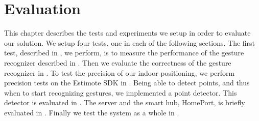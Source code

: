 \chapter{Evaluation}\label{chap:evaluation}
This chapter describes the tests and experiments we setup in order to evaluate our solution. 
We setup four tests, one in each of the following sections. 
The first test, described in , we perform, 
is to measure the performance of the gesture recognizer described in . 
Then we evaluate the correctness of the gesture recognizer in .
To test the precision of our indoor positioning, 
we perform precision tests on the Estimote SDK in .
Being able to detect points, and thus when to start recognizing gestures, we implemented a point detector. This detector is evaluated in .
The server and the smart hub, HomePort, is briefly evaluated in .
Finally we test the system as a whole in .







% 